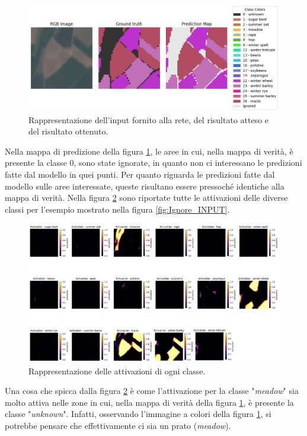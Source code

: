 \begin{figure}[H]
    \centering
    \includegraphics[width=1\textwidth]{Immagini/sperimentazione/LABEL_Ignore_Edit.png}
    \caption{Rappresentazione dell'input fornito alla rete, del risultato atteso e del risultato ottenuto.}
    \label{fig:Ignore_LABELS}
\end{figure}

Nella mappa di predizione della figura \ref{fig:Ignore_LABELS}, le aree in cui, 
nella mappa di verità, è presente la classe 0, sono state ignorate, in quanto non ci 
interessano le predizioni fatte dal modello in quei punti. Per quanto riguarda 
le predizioni fatte dal modello sulle aree interessate, queste risultano essere 
pressoché identiche alla mappa di verità.
Nella figura \ref{fig:Activations} sono riportate tutte le attivazioni 
delle diverse classi per l'esempio mostrato nella figura \ref{fig:Ignore_INPUT}.

\begin{figure}[H]
    \centering
    \includegraphics[width=1.05\textwidth]{Immagini/sperimentazione/ACTIVATIONS_Ignore_Edit_v2.png}
    \caption{Rappresentazione delle attivazioni di ogni classe.}
    \label{fig:Activations}
\end{figure}

Una cosa che spicca dalla figura \ref{fig:Activations} è come l'attivazione per la classe 
"\textit{meadow}" sia molto attiva nelle zone in cui, nella mappa di verità della figura 
\ref{fig:Ignore_LABELS}, è presente la classe "\textit{unknown}". Infatti, osservando 
l'immagine a colori della figura \ref{fig:Ignore_LABELS}, si potrebbe pensare 
che effettivamente ci sia un prato (\textit{meadow}).

